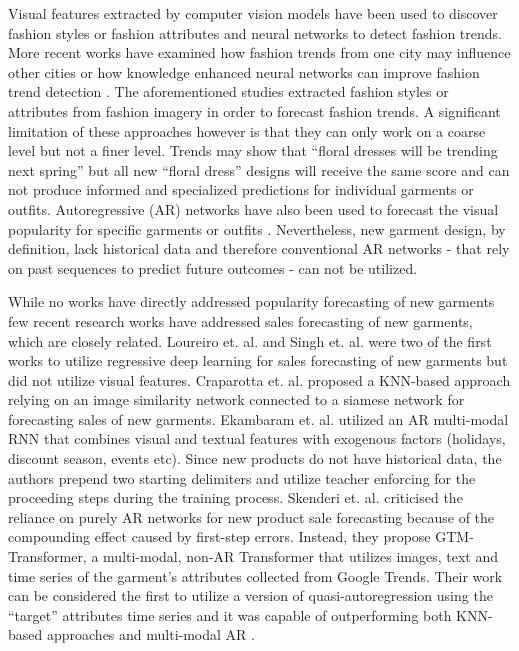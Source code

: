 \documentclass{article}
\begin{document}
Visual features extracted by computer vision models have been used to discover fashion styles \cite{al2017fashion} or fashion attributes \cite{mall2019geostyle} and neural networks to detect fashion trends.
More recent works have examined how fashion trends from one city may influence other cities \cite{al2020paris} or how knowledge enhanced neural networks can improve fashion trend detection \cite{ma2020knowledge}. 
The aforementioned studies extracted fashion styles or attributes from fashion imagery in order to forecast fashion trends. A significant limitation of these approaches however is that they can only work on a coarse level but not a finer level.
Trends may show that “floral dresses will be trending next spring” but all new “floral dress” designs will receive the same score and can not produce informed and specialized predictions for individual garments or outfits. Autoregressive (AR) networks have also been used to forecast the visual popularity for specific garments or outfits \cite{lo2019dressing}. 
Nevertheless, new garment design, by definition, lack historical data and therefore conventional AR networks - that rely on past sequences to predict future outcomes - can not be utilized.

While no works have directly addressed popularity forecasting of new garments few recent research works have addressed sales forecasting of new garments, which are closely related.
Loureiro et. al. \cite{loureiro2018exploring} and Singh et. al. \cite{singh2019fashion} were two of the first works to utilize regressive deep learning for sales forecasting of new garments but did not utilize visual features. 
Craparotta et. al. \cite{craparotta2019siamese} proposed a KNN-based approach relying on an image similarity network connected to a siamese network for forecasting sales of new garments. 
Ekambaram et. al. \cite{ekambaram2020attention} utilized an AR multi-modal RNN that combines visual and textual features with exogenous factors (holidays, discount season, events etc). Since new products do not have historical data, the authors prepend two starting delimiters and utilize teacher enforcing for the proceeding steps during the training process. 
Skenderi et. al. \cite{skenderi2021well} criticised the reliance on purely AR networks for new product sale forecasting because of the compounding effect caused by first-step errors. 
Instead, they propose GTM-Transformer, a multi-modal, non-AR Transformer that utilizes images, text and time series of the garment's attributes collected from Google Trends. 
Their work can be considered the first to utilize a version of quasi-autoregression using the ``target'' attributes time series and it was capable of outperforming both KNN-based approaches \cite{craparotta2019siamese} and multi-modal AR \cite{ekambaram2020attention}.
\end{document}
